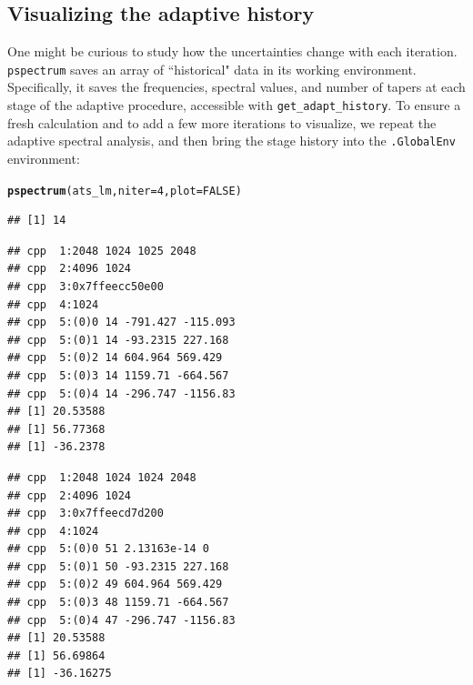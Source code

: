 \documentclass[10pt]{article}\usepackage[]{graphicx}\usepackage[]{color}
\makeatletter
\newcommand{\hlnum}[1]{\textcolor[rgb]{0.686,0.059,0.569}{#1}}%
\newcommand{\hlstd}[1]{\textcolor[rgb]{0.345,0.345,0.345}{#1}}%
\newcommand{\hlkwc}[1]{\textcolor[rgb]{0.333,0.667,0.333}{#1}}%
\newcommand{\hlkwd}[1]{\textcolor[rgb]{0.737,0.353,0.396}{\textbf{#1}}}%
\newenvironment{kframe}{%
 \def\at@end@of@kframe{}%
 \ifinner\ifhmode%
  \def\at@end@of@kframe{\end{minipage}}%
  \begin{minipage}{\columnwidth}%
 \fi\fi%
 \def\FrameCommand##1{\hskip\@totalleftmargin \hskip-\fboxsep
 \colorbox{shadecolor}{##1}\hskip-\fboxsep
     \hskip-\linewidth \hskip-\@totalleftmargin \hskip\columnwidth}%
 \MakeFramed {\advance\hsize-\width
   \@totalleftmargin\z@ \linewidth\hsize
   \@setminipage}}%
 {\par\unskip\endMakeFramed%
 \at@end@of@kframe}
\newenvironment{knitrout}{}{} %
\newcommand{\Rcmd}[1]{\texttt{#1}}
\makeatother
\begin{document}
\subsection{Visualizing the adaptive history}
One might be curious to study how the
uncertainties change with each iteration.
\Rcmd{pspectrum}
 saves an array of ``historical" data in its working environment.
 Specifically, it saves the frequencies,
 spectral values, and number of tapers at each stage of the adaptive
 procedure, accessible with \Rcmd{get\_adapt\_history}.
 To ensure a fresh calculation and to 
 add a few more iterations to visualize, 
we repeat the adaptive spectral analysis, 
and then bring the stage history into the \Rcmd{.GlobalEnv} environment:
\begin{knitrout}\small
{}\color{fgcolor}\begin{kframe}
\begin{alltt}
\hlkwd{pspectrum}\hlstd{(ats_lm,} \hlkwc{niter} \hlstd{=} \hlnum{4}\hlstd{,} \hlkwc{plot} \hlstd{=} \hlnum{FALSE}\hlstd{)}
\end{alltt}


{\ttfamily\noindent\itshape\color{messagecolor}{\#\# Stage\ \ 0 est. (pilot) \\\#\# 	environment\ \ ** .psdEnv **\ \ refreshed\\\#\# detrending (and demeaning)\\\#\# tap c A 1 1024}}\begin{verbatim}
## [1] 14
\end{verbatim}


{\ttfamily\noindent\itshape\color{messagecolor}{\#\# f creation}}\begin{verbatim}
## cpp  1:2048 1024 1025 2048
## cpp  2:4096 1024
## cpp  3:0x7ffeecc50e00
## cpp  4:1024
## cpp  5:(0)0 14 -791.427 -115.093
## cpp  5:(0)1 14 -93.2315 227.168
## cpp  5:(0)2 14 604.964 569.429
## cpp  5:(0)3 14 1159.71 -664.567
## cpp  5:(0)4 14 -296.747 -1156.83
## [1] 20.53588
## [1] 56.77368
## [1] -36.2378
\end{verbatim}


{\ttfamily\noindent\itshape\color{messagecolor}{\#\# f creation}}\begin{verbatim}
## cpp  1:2048 1024 1024 2048
## cpp  2:4096 1024
## cpp  3:0x7ffeecd7d200
## cpp  4:1024
## cpp  5:(0)0 51 2.13163e-14 0
## cpp  5:(0)1 50 -93.2315 227.168
## cpp  5:(0)2 49 604.964 569.429
## cpp  5:(0)3 48 1159.71 -664.567
## cpp  5:(0)4 47 -296.747 -1156.83
## [1] 20.53588
## [1] 56.69864
## [1] -36.16275
\end{verbatim}



\end{kframe}
\end{knitrout}
\end{document}
